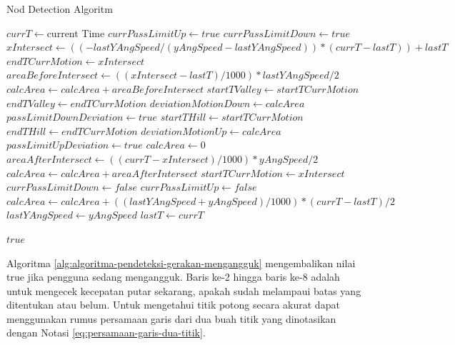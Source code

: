 \begin{algorithm}
	\caption{Nod Detection Algoritm}
	\label{alg:algoritma-pendeteksi-gerakan-mengangguk}
	\begin{algorithmic}[1]
		\State $currT \gets $current Time 
			\State $currPassLimitUp \gets true$
			\State $currPassLimitDown \gets true$
		\EndIf
			\State $xIntersect \gets ((-lastYAngSpeed / (yAngSpeed - lastYAngSpeed)) * (currT - lastT))+lastT$
			\State $endTCurrMotion \gets xIntersect$
			\State $areaBeforeIntersect \gets ((xIntersect - lastT) / 1000) * lastYAngSpeed / 2$
			\State $calcArea \gets calcArea + areaBeforeIntersect$
				\State $startTValley \gets startTCurrMotion$
				\State $endTValley \gets endTCurrMotion$
				\State $deviationMotionDown \gets calcArea$
					\State $passLimitDownDeviation \gets true$
				\EndIf
				\State $startTHill \gets startTCurrMotion$
				\State $endTHill \gets endTCurrMotion$
				\State $deviationMotionUp \gets calcArea$
					\State $passLimitUpDeviation \gets true$
				\EndIf
			\EndIf
			\State $calcArea \gets 0$
			\State $areaAfterIntersect \gets ((currT - xIntersect) / 1000) * yAngSpeed / 2$ 
			\State $calcArea \gets calcArea + areaAfterIntersect$ 
			\State $startTCurrMotion \gets xIntersect$ 
			\State $currPassLimitDown \gets false$ 
			\State $currPassLimitUp \gets false$ 
		\Else 
			\State $calcArea \gets calcArea + ((lastYAngSpeed + yAngSpeed) / 1000) * (currT - lastT) / 2$
		\EndIf
		\State $lastYAngSpeed \gets yAngSpeed$
		\State $lastT \gets currT$
		
			\Return $true$
		\EndIf
	\EndFunction  
	\end{algorithmic}
\end{algorithm}

Algoritma \ref{alg:algoritma-pendeteksi-gerakan-mengangguk} mengembalikan nilai true jika pengguna sedang mengangguk. Baris ke-2 hingga baris ke-8 adalah untuk mengecek kecepatan putar sekarang, apakah sudah melampaui batas yang ditentukan atau belum. Untuk mengetahui titik potong secara akurat dapat menggunakan rumus persamaan garis dari dua buah titik yang dinotasikan dengan Notasi \ref{eq:persamaan-garis-dua-titik}.   

